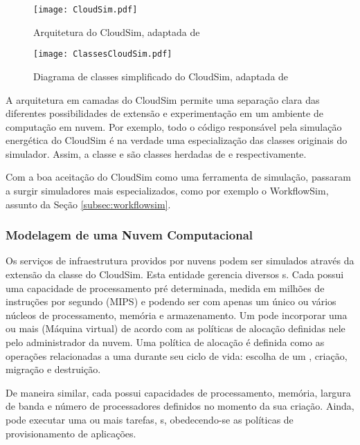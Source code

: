 \begin{figure}[ht]
\centering
\texttt{[image: CloudSim.pdf]}
\caption{Arquitetura do CloudSim, adaptada de \cite{calheiros:cloudsim}}
\label{fig:arquitetura_cloudsim}
\end{figure}

\begin{figure}[ht]
\centering
\texttt{[image: ClassesCloudSim.pdf]}
\caption{Diagrama de classes simplificado do CloudSim, adaptada de \cite{calheiros:cloudsim}}
\label{fig:classes_cloudsim}
\end{figure}

A arquitetura em camadas do CloudSim permite uma separação clara das diferentes
possibilidades de extensão e experimentação em um ambiente de computação em nuvem.
Por exemplo, todo o código responsável pela simulação energética do CloudSim
é na verdade uma especialização das classes originais do simulador. Assim,
a classe  e  são classes herdadas de
 e  respectivamente.

Com a boa aceitação do CloudSim como uma ferramenta de simulação, passaram a 
surgir simuladores mais especializados, como por exemplo o WorkflowSim, assunto
da Seção \ref{subsec:workflowsim}.

\subsubsection{Modelagem de uma Nuvem Computacional}

Os serviços de infraestrutura providos por nuvens podem ser simulados através 
da extensão da classe  do CloudSim. Esta entidade gerencia
diversos s. Cada  possui uma capacidade de processamento 
pré determinada, medida em milhões de instruções por segundo (MIPS) e podendo 
ser com apenas um único ou vários núcleos de processamento, memória e
armazenamento. Um  pode incorporar uma ou mais  (Máquina virtual)
de acordo com as políticas de alocação definidas nele pelo administrador da nuvem.
Uma política de alocação é definida como as operações relacionadas a uma
 durante seu ciclo de vida: escolha de um , criação, 
migração e destruição.

De maneira similar, cada  possui capacidades de processamento, memória,
largura de banda e número de processadores definidos no momento da sua criação.
Ainda, pode executar uma ou mais tarefas, s, obedecendo-se as
políticas de provisionamento de aplicações.

